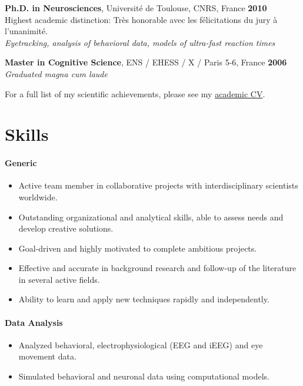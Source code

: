 \documentclass[margin,line]{resume}
\begin{document}
\begin{resume}
	\vspace{-1.5mm}	
         \textbf{Ph.D. in Neurosciences}, Université de Toulouse, CNRS, France \hfill \textbf{2010}\\
	Highest academic distinction: Très honorable avec les félicitations du jury à l'unanimité.\\
	\textsl{Eyetracking, analysis of behavioral data, models of ultra-fast reaction times}
	
	\vspace{-1.5mm}
	\textbf{Master in Cognitive Science}, ENS / EHESS / X / Paris 5-6, France  \hfill \textbf{2006}\\
	\textsl{Graduated magna cum laude}
	
	\vspace{-1.5mm}
	For a full list of my scientific achievements, please see my \href{http://scrouzet.github.io/cv/CVSebastienCrouzet.pdf}{academic CV}.



    \vspace{3mm}
    \section{\mysidestyle Skills}
    \vspace{-0.5mm}

	\paragraph{Generic}
	\begin{itemize} \itemsep1pt \parskip0pt  \leftmargin=0em \itemindent=-1.5em
  		\item Active team member in collaborative projects with interdisciplinary scientists worldwide.
  		\item Outstanding organizational and analytical skills, able to assess needs and develop creative solutions. 
  		\item Goal-driven and highly motivated to complete ambitious projects.
  		\item Effective and accurate in background research and follow-up of the literature in several active fields.
  		\item Ability to learn and apply new techniques rapidly and independently.
	\end{itemize}

	\paragraph{Data Analysis}
	\begin{itemize} \itemsep1pt \parskip0pt  \leftmargin=0em \itemindent=-1.5em
  	\item Analyzed behavioral, electrophysiological (EEG and iEEG) and eye movement data.
	\item Simulated behavioral and neuronal data using computational models.
	\end{itemize}
		

\end{resume}
\end{document}
